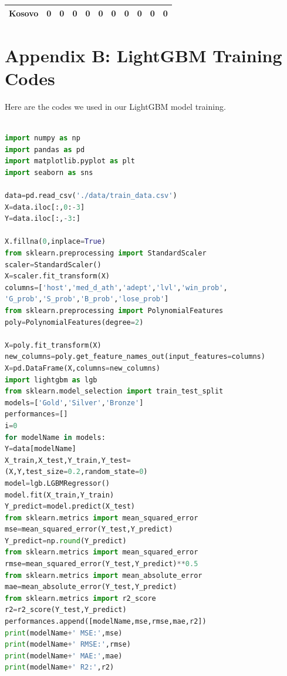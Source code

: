 \documentclass[12pt]{article}  %
\begin{document}
\begin{subappendices}
\begin{longtable}{|l|c|c|c|c|c|c|c|c|c|c|}
	\hline
	Kosovo                                                         & 0                                                                      & 0                                                                      & 0                                                                      & 0                                                                      & 0                                                                      & 0                                                                      & 0                         & 0                           & 0                           & 0                           \\
	\hline
\end{longtable}


\clearpage
\section{Appendix B: LightGBM Training Codes}
Here are the codes we used in our LightGBM model training.




\begin{lstlisting}[language=Python, name={LightGBM.py}]

import numpy as np
import pandas as pd
import matplotlib.pyplot as plt
import seaborn as sns

data=pd.read_csv('./data/train_data.csv')
X=data.iloc[:,0:-3]
Y=data.iloc[:,-3:]

X.fillna(0,inplace=True)
from sklearn.preprocessing import StandardScaler
scaler=StandardScaler()
X=scaler.fit_transform(X)
columns=['host','med_d_ath','adept','lvl','win_prob',
'G_prob','S_prob','B_prob','lose_prob']
from sklearn.preprocessing import PolynomialFeatures
poly=PolynomialFeatures(degree=2)

X=poly.fit_transform(X)
new_columns=poly.get_feature_names_out(input_features=columns)
X=pd.DataFrame(X,columns=new_columns)
import lightgbm as lgb
from sklearn.model_selection import train_test_split
models=['Gold','Silver','Bronze']
performances=[]
i=0
for modelName in models:
Y=data[modelName]
X_train,X_test,Y_train,Y_test=
(X,Y,test_size=0.2,random_state=0)
model=lgb.LGBMRegressor()
model.fit(X_train,Y_train)
Y_predict=model.predict(X_test)
from sklearn.metrics import mean_squared_error
mse=mean_squared_error(Y_test,Y_predict)
Y_predict=np.round(Y_predict)
from sklearn.metrics import mean_squared_error
rmse=mean_squared_error(Y_test,Y_predict)**0.5
from sklearn.metrics import mean_absolute_error
mae=mean_absolute_error(Y_test,Y_predict)
from sklearn.metrics import r2_score
r2=r2_score(Y_test,Y_predict)
performances.append([modelName,mse,rmse,mae,r2])
print(modelName+' MSE:',mse)
print(modelName+' RMSE:',rmse)
print(modelName+' MAE:',mae)
print(modelName+' R2:',r2)


\end{lstlisting}
\end{subappendices}
\end{document}
